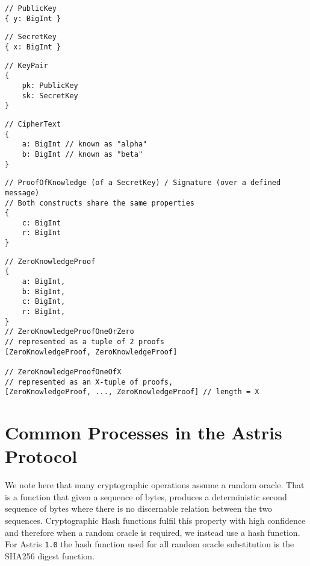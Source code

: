 \label{dt:elgamal:pk}
\begin{lstlisting}[style=ES6]
// PublicKey
{ y: BigInt }
\end{lstlisting}
\vspace*{-0.95em}
\label{dt:elgamal:sk}
\begin{lstlisting}[style=ES6, firstnumber=last]
// SecretKey
{ x: BigInt }
\end{lstlisting}
\vspace*{-0.95em}
\label{dt:elgamal:keypair}
\begin{lstlisting}[style=ES6, firstnumber=last]
// KeyPair
{
    pk: PublicKey
    sk: SecretKey
}
\end{lstlisting}
\vspace*{-0.95em}
\label{dt:elgamal:ct}
\begin{lstlisting}[style=ES6, firstnumber=last]
// CipherText
{
    a: BigInt // known as "alpha"
    b: BigInt // known as "beta"
}
\end{lstlisting}
\vspace*{-0.95em}
\label{dt:elgamal:pok}
\begin{lstlisting}[style=ES6, firstnumber=last]
// ProofOfKnowledge (of a SecretKey) / Signature (over a defined message)
// Both constructs share the same properties
{
    c: BigInt
    r: BigInt
}
\end{lstlisting}
\vspace*{-0.95em}
\label{dt:elgamal:zkp}
\begin{lstlisting}[style=ES6, firstnumber=last]
// ZeroKnowledgeProof
{
    a: BigInt,
    b: BigInt,
    c: BigInt,
    r: BigInt,
}
// ZeroKnowledgeProofOneOrZero
// represented as a tuple of 2 proofs
[ZeroKnowledgeProof, ZeroKnowledgeProof]

// ZeroKnowledgeProofOneOfX
// represented as an X-tuple of proofs,
[ZeroKnowledgeProof, ..., ZeroKnowledgeProof] // length = X
\end{lstlisting}


\chapter{Common Processes in the Astris Protocol}
\label{appendix:processes}

We note here that many cryptographic operations assume a random oracle. That is a function that given a sequence of bytes, produces a deterministic second sequence of bytes where there is no discernable relation between the two sequences. Cryptographic Hash functions fulfil this property with high confidence and therefore when a random oracle is required, we instead use a hash function. For Astris \texttt{1.0} the hash function used for all random oracle substitution is the SHA256 digest function.


